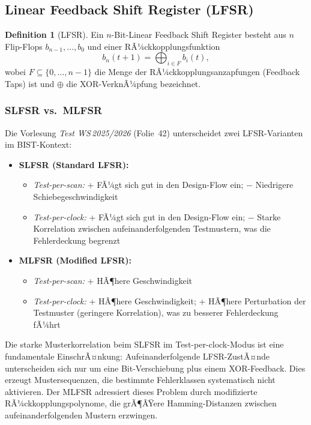 ﻿\documentclass[a4paper,12pt]{article}
\theoremstyle{definition}
\newtheorem{definition}{Definition}
\begin{document}
\subsection{Linear Feedback Shift Register (LFSR)}

\begin{definition}[LFSR]
  Ein $n$-Bit-Linear Feedback Shift Register besteht aus $n$ Flip-Flops
  $b_{n-1}, \ldots, b_0$ und einer RÃ¼ckkopplungsfunktion
  \[
    b_n(t+1) = \bigoplus_{i \in F} b_i(t),
  \]
  wobei $F \subseteq \{0, \ldots, n-1\}$ die Menge der
  RÃ¼ckkopplungs\-anzapfungen (Feedback Taps) ist und $\oplus$ die
  XOR-VerknÃ¼pfung bezeichnet.
\end{definition}

\subsubsection{SLFSR vs.\ MLFSR}

Die Vorlesung \emph{Test WS\,2025/2026} (Folie~42) unterscheidet zwei
LFSR-Varianten im BIST-Kontext:

\begin{itemize}
  \item \textbf{SLFSR (Standard LFSR):}
    \begin{itemize}
      \item \emph{Test-per-scan:} + FÃ¼gt sich gut in den Design-Flow ein;
            $-$ Niedrigere Schiebegeschwindigkeit
      \item \emph{Test-per-clock:} + FÃ¼gt sich gut in den Design-Flow ein;
            $-$ Starke Korrelation zwischen aufeinanderfolgenden
            Testmustern, was die Fehlerdeckung begrenzt
    \end{itemize}
  \item \textbf{MLFSR (Modified LFSR):}
    \begin{itemize}
      \item \emph{Test-per-scan:} + HÃ¶here Geschwindigkeit
      \item \emph{Test-per-clock:} + HÃ¶here Geschwindigkeit;
            + HÃ¶here Perturbation der Testmuster (geringere Korrelation),
            was zu besserer Fehlerdeckung fÃ¼hrt
    \end{itemize}
\end{itemize}

Die starke Musterkorrelation beim SLFSR im Test-per-clock-Modus ist eine
fundamentale EinschrÃ¤nkung: Aufeinanderfolgende LFSR-ZustÃ¤nde unterscheiden
sich nur um eine Bit-Verschiebung plus einem XOR-Feedback. Dies erzeugt
Mustersequenzen, die bestimmte Fehlerklassen systematisch nicht aktivieren.
Der MLFSR adressiert dieses Problem durch modifizierte RÃ¼ckkopplungspolynome,
die grÃ¶ÃŸere Hamming-Distanzen zwischen aufeinanderfolgenden Mustern erzwingen.
\end{document}

